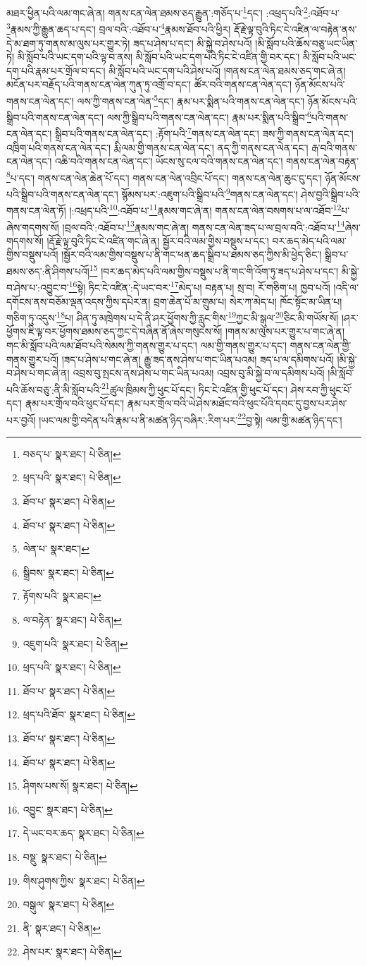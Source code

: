 མཐར་ཕྱིན་པའི་ལམ་གང་ཞེ་ན། གནས་ངན་ལེན་ཐམས་ཅད་རྒྱུན་:གཅོད་པ་\footnote{བཅད་པ་  སྣར་ཐང་།  པེ་ཅིན། }དང་། :འཕྲད་པའི་\footnote{ཕྲད་པའི་  སྣར་ཐང་།  པེ་ཅིན། }:འཐོབ་པ་\footnote{ཐོབ་པ་  སྣར་ཐང་།  པེ་ཅིན། }རྣམས་ཀྱི་རྒྱུན་ཆད་པ་དང་། བྲལ་བའི་:འཐོབ་པ་\footnote{ཐོབ་པ་  སྣར་ཐང་།  པེ་ཅིན། }རྣམས་ཐོབ་པའི་ཕྱིར། རྡོ་རྗེ་ལྟ་བུའི་ཏིང་ངེ་འཛིན་ལ་བརྟེན་ནས་དེ་མ་ཐག་ཏུ་གནས་མ་ལུས་པར་གྱུར་ཏེ། ཟད་པ་ཤེས་པ་དང་། མི་སྐྱེ་བ་ཤེས་པའོ། །མི་སློབ་པའི་ཆོས་བཅུ་ཡང་ཡིན་ཏེ། མི་སློབ་པའི་ཡང་དག་པའི་ལྟ་བ་ནས། མི་སློབ་པའི་ཡང་དག་པའི་ཏིང་ངེ་འཛིན་གྱི་བར་དང་། མི་སློབ་པའི་ཡང་དག་པའི་རྣམ་པར་གྲོལ་བ་དང་། མི་སློབ་པའི་ཡང་དག་པའི་ཤེས་པའོ། །གནས་ངན་ལེན་ཐམས་ཅད་གང་ཞེ་ན། མངོན་པར་བརྗོད་པའི་གནས་ངན་ལེན་ཀུན་ཏུ་འགྲོ་བ་དང་། ཚོར་བའི་གནས་ངན་ལེན་དང་། ཉོན་མོངས་པའི་གནས་ངན་ལེན་དང་། ལས་ཀྱི་གནས་ངན་ལེན་\footnote{ལེན་པ་  སྣར་ཐང་། }དང་། རྣམ་པར་སྨིན་པའི་གནས་ངན་ལེན་དང་། ཉོན་མོངས་པའི་སྒྲིབ་པའི་གནས་ངན་ལེན་དང་། ལས་ཀྱི་སྒྲིབ་པའི་གནས་ངན་ལེན་དང་། རྣམ་པར་སྨིན་པའི་སྒྲིབ་\footnote{སྒྲིབས་  སྣར་ཐང་།  པེ་ཅིན། }པའི་གནས་ངན་ལེན་དང་། སྒྲིབ་པའི་གནས་ངན་ལེན་དང་། :རྟོག་པའི་\footnote{རྟོགས་པའི་  སྣར་ཐང་། }གནས་ངན་ལེན་དང་། ཟས་ཀྱི་གནས་ངན་ལེན་དང་། འཁྲིག་པའི་གནས་ངན་ལེན་དང་། རྨི་ལམ་གྱི་གནས་ངན་ལེན་དང་། ནད་ཀྱི་གནས་ངན་ལེན་དང་། རྒ་བའི་གནས་ངན་ལེན་དང་། འཆི་བའི་གནས་ངན་ལེན་དང་། ཡོངས་སུ་ངལ་བའི་གནས་ངན་ལེན་དང་། གནས་ངན་ལེན་བརྟན་\footnote{ལ་བརྟེན་  སྣར་ཐང་།  པེ་ཅིན། }པ་དང་། གནས་ངན་ལེན་ཆེན་པོ་དང་། གནས་ངན་ལེན་འབྲིང་པོ་དང་། གནས་ངན་ལེན་ཆུང་ངུ་དང་། ཉོན་མོངས་པའི་སྒྲིབ་པའི་གནས་ངན་ལེན་དང་། སྙོམས་པར་:འཇུག་པའི་སྒྲིབ་པའི་\footnote{འཇུག་པའི་  སྣར་ཐང་།  པེ་ཅིན། }གནས་ངན་ལེན་དང་། ཤེས་བྱའི་སྒྲིབ་པའི་གནས་ངན་ལེན་ཏོ། །:འཕྲད་པའི་\footnote{ཕྲད་པའི་  སྣར་ཐང་།  པེ་ཅིན། }:འཐོབ་པ་\footnote{ཐོབ་པ་  སྣར་ཐང་།  པེ་ཅིན། }རྣམས་གང་ཞེ་ན། གནས་ངན་ལེན་བསགས་པ་ལ་འཐོབ་\footnote{ཕྲད་པའི་ཐོབ་  སྣར་ཐང་།  པེ་ཅིན། }པ་ཞེས་གདགས་སོ། །བྲལ་བའི་:འཐོབ་པ་\footnote{ཐོབ་པ་  སྣར་ཐང་།  པེ་ཅིན། }རྣམས་གང་ཞེ་ན། གནས་ངན་ལེན་ཟད་པ་ལ་བྲལ་བའི་:འཐོབ་པ་\footnote{ཐོབ་པ་  སྣར་ཐང་།  པེ་ཅིན། }ཞེས་གདགས་སོ། །རྡོ་རྗེ་ལྟ་བུའི་ཏིང་ངེ་འཛིན་གང་ཞེ་ན། སྦྱོར་བའི་ལམ་གྱིས་བསྡུས་པ་དང་། བར་ཆད་མེད་པའི་ལམ་གྱིས་བསྡུས་པའོ། །སྦྱོར་བའི་ལམ་གྱིས་བསྡུས་པ་ནི་གང་ཕན་ཆད་སྒྲིབ་པ་ཐམས་ཅད་ཀྱིས་མི་ཕྱེད་ཅིང་། སྒྲིབ་པ་ཐམས་ཅད་:ནི་ཤིགས་པའོ།\footnote{ཤིགས་པས་སོ།  སྣར་ཐང་།  པེ་ཅིན། } །བར་ཆད་མེད་པའི་ལམ་གྱིས་བསྡུས་པ་ནི་གང་གི་འོག་ཏུ་ཟད་པ་ཤེས་པ་དང་། མི་སྐྱེ་བ་ཤེས་པ་:འབྱུང་བ་\footnote{འབྱུང་  སྣར་ཐང་།  པེ་ཅིན། }སྟེ། ཏིང་ངེ་འཛིན་:དེ་ཡང་བར་\footnote{དེ་ཡང་བར་ཆད་  སྣར་ཐང་།  པེ་ཅིན། }མེད་པ། བརྟན་པ། སྲ་བ། རོ་གཅིག་པ། ཁྱབ་པའོ། །འདི་ལ་དགོངས་ནས་བཅོམ་ལྡན་འདས་ཀྱིས་དཔེར་ན། བྲག་ཆེན་པོ་མ་གྲུམ་པ། སེར་ཀ་མེད་པ། ཁོང་སྟོང་མ་ཡིན་པ། གཅིག་ཏུ་འདུས་\footnote{བསྡུ་  སྣར་ཐང་།  པེ་ཅིན། }པ། ཤིན་ཏུ་མཁྲེགས་པ་དེ་ནི་ཤར་ཕྱོགས་ཀྱི་རླུང་གིས་\footnote{གིས་ཤུགས་ཀྱིས་  སྣར་ཐང་།  པེ་ཅིན། }ཀྱང་མི་སྒུལ་\footnote{བསྒུལ་  སྣར་ཐང་།  པེ་ཅིན། }ཅིང་མི་གཡོས་སོ། །ཤར་ཕྱོགས་ཇི་ལྟ་བར་ཕྱོགས་ཐམས་ཅད་ཀྱང་དེ་བཞིན་ནོ་ཞེས་གསུངས་སོ། །གནས་མ་ལུས་པར་གྱུར་པ་གང་ཞེ་ན། གང་མི་སློབ་པའི་ལམ་ཐོབ་པའི་སེམས་ཀྱི་གནས་གྱུར་པ་དང་། ལམ་གྱི་གནས་གྱུར་པ་དང་། གནས་ངན་ལེན་གྱི་གནས་གྱུར་པའོ། །ཟད་པ་ཤེས་པ་གང་ཞེ་ན། རྒྱུ་ཟད་ནས་ཤེས་པ་གང་ཡིན་པའམ། ཟད་པ་ལ་དམིགས་པའོ། །མི་སྐྱེ་བ་ཤེས་པ་གང་ཞེ་ན། འབྲས་བུ་སྤངས་ནས་ཤེས་པ་གང་ཡིན་པའམ། འབྲས་བུ་མི་སྐྱེ་བ་ལ་དམིགས་པའོ། །མི་སློབ་པའི་ཆོས་བཅུ་:ནི་མི་སློབ་པའི་\footnote{ནི་  སྣར་ཐང་།  པེ་ཅིན། }ཚུལ་ཁྲིམས་ཀྱི་ཕུང་པོ་དང་། ཏིང་ངེ་འཛིན་གྱི་ཕུང་པོ་དང་། ཤེས་རབ་ཀྱི་ཕུང་པོ་དང་། རྣམ་པར་གྲོལ་བའི་ཕུང་པོ་དང་། རྣམ་པར་གྲོལ་བའི་ཡེ་ཤེས་མཐོང་བའི་ཕུང་པོའི་དབང་དུ་བྱས་པར་ཤེས་པར་བྱའོ། །ཡང་ལམ་གྱི་བདེན་པའི་རྣམ་པ་ནི་མཚན་ཉིད་བཞིར་:རིག་པར་\footnote{ཤེས་པར་  སྣར་ཐང་།  པེ་ཅིན། }བྱ་སྟེ། ལམ་གྱི་མཚན་ཉིད་དང་། 